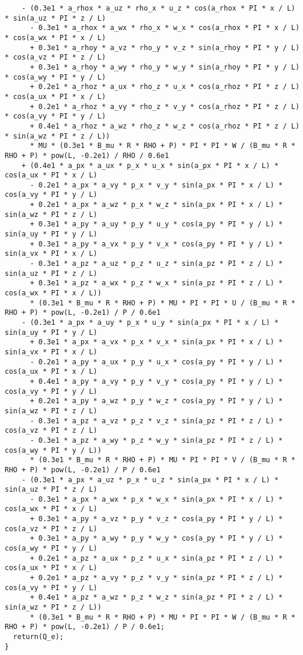 \documentclass[10pt]{article}
\begin{document}
\begin{small}
\begin{verbatim}
    - (0.3e1 * a_rhox * a_uz * rho_x * u_z * cos(a_rhox * PI * x / L) * sin(a_uz * PI * z / L)
      - 0.3e1 * a_rhox * a_wx * rho_x * w_x * cos(a_rhox * PI * x / L) * cos(a_wx * PI * x / L)
      + 0.3e1 * a_rhoy * a_vz * rho_y * v_z * sin(a_rhoy * PI * y / L) * cos(a_vz * PI * z / L)
      + 0.3e1 * a_rhoy * a_wy * rho_y * w_y * sin(a_rhoy * PI * y / L) * cos(a_wy * PI * y / L)
      + 0.2e1 * a_rhoz * a_ux * rho_z * u_x * cos(a_rhoz * PI * z / L) * cos(a_ux * PI * x / L)
      + 0.2e1 * a_rhoz * a_vy * rho_z * v_y * cos(a_rhoz * PI * z / L) * cos(a_vy * PI * y / L)
      + 0.4e1 * a_rhoz * a_wz * rho_z * w_z * cos(a_rhoz * PI * z / L) * sin(a_wz * PI * z / L))
      * MU * (0.3e1 * B_mu * R * RHO + P) * PI * PI * W / (B_mu * R * RHO + P) * pow(L, -0.2e1) / RHO / 0.6e1
    + (0.4e1 * a_px * a_ux * p_x * u_x * sin(a_px * PI * x / L) * cos(a_ux * PI * x / L)
      - 0.2e1 * a_px * a_vy * p_x * v_y * sin(a_px * PI * x / L) * cos(a_vy * PI * y / L)
      + 0.2e1 * a_px * a_wz * p_x * w_z * sin(a_px * PI * x / L) * sin(a_wz * PI * z / L)
      + 0.3e1 * a_py * a_uy * p_y * u_y * cos(a_py * PI * y / L) * sin(a_uy * PI * y / L)
      + 0.3e1 * a_py * a_vx * p_y * v_x * cos(a_py * PI * y / L) * sin(a_vx * PI * x / L)
      - 0.3e1 * a_pz * a_uz * p_z * u_z * sin(a_pz * PI * z / L) * sin(a_uz * PI * z / L)
      + 0.3e1 * a_pz * a_wx * p_z * w_x * sin(a_pz * PI * z / L) * cos(a_wx * PI * x / L))
      * (0.3e1 * B_mu * R * RHO + P) * MU * PI * PI * U / (B_mu * R * RHO + P) * pow(L, -0.2e1) / P / 0.6e1
    - (0.3e1 * a_px * a_uy * p_x * u_y * sin(a_px * PI * x / L) * sin(a_uy * PI * y / L)
      + 0.3e1 * a_px * a_vx * p_x * v_x * sin(a_px * PI * x / L) * sin(a_vx * PI * x / L)
      - 0.2e1 * a_py * a_ux * p_y * u_x * cos(a_py * PI * y / L) * cos(a_ux * PI * x / L)
      + 0.4e1 * a_py * a_vy * p_y * v_y * cos(a_py * PI * y / L) * cos(a_vy * PI * y / L)
      + 0.2e1 * a_py * a_wz * p_y * w_z * cos(a_py * PI * y / L) * sin(a_wz * PI * z / L)
      - 0.3e1 * a_pz * a_vz * p_z * v_z * sin(a_pz * PI * z / L) * cos(a_vz * PI * z / L)
      - 0.3e1 * a_pz * a_wy * p_z * w_y * sin(a_pz * PI * z / L) * cos(a_wy * PI * y / L))
      * (0.3e1 * B_mu * R * RHO + P) * MU * PI * PI * V / (B_mu * R * RHO + P) * pow(L, -0.2e1) / P / 0.6e1
    - (0.3e1 * a_px * a_uz * p_x * u_z * sin(a_px * PI * x / L) * sin(a_uz * PI * z / L)
      - 0.3e1 * a_px * a_wx * p_x * w_x * sin(a_px * PI * x / L) * cos(a_wx * PI * x / L)
      + 0.3e1 * a_py * a_vz * p_y * v_z * cos(a_py * PI * y / L) * cos(a_vz * PI * z / L)
      + 0.3e1 * a_py * a_wy * p_y * w_y * cos(a_py * PI * y / L) * cos(a_wy * PI * y / L)
      + 0.2e1 * a_pz * a_ux * p_z * u_x * sin(a_pz * PI * z / L) * cos(a_ux * PI * x / L)
      + 0.2e1 * a_pz * a_vy * p_z * v_y * sin(a_pz * PI * z / L) * cos(a_vy * PI * y / L)
      + 0.4e1 * a_pz * a_wz * p_z * w_z * sin(a_pz * PI * z / L) * sin(a_wz * PI * z / L))
      * (0.3e1 * B_mu * R * RHO + P) * MU * PI * PI * W / (B_mu * R * RHO + P) * pow(L, -0.2e1) / P / 0.6e1;
  return(Q_e);
}
\end{verbatim}
\end{small}
 

\end{document}
